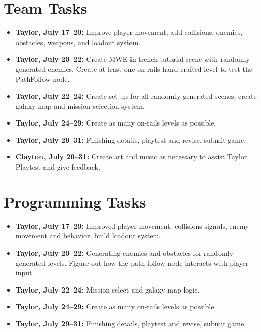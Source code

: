\documentclass[journal]{IEEEtran}
\begin{document}
\section{Team Tasks}

\begin{itemize}

    \item \textbf{Taylor, July 17--20:}
    Improve player movement, add collisions, enemies, obstacles, weapons, and loadout system.

    \item \textbf{Taylor, July 20--22:}
    Create MWE in trench tutorial scene with randomly generated enemies. Create at least one on-rails hand-crafted level to test the PathFollow node. 

    \item \textbf{Taylor, July 22--24:}
    Create set-up for all randomly generated scenes, create galaxy map and mission selection system.

    \item \textbf{Taylor, July 24--29:}
    Create as many on-rails levels as possible. 

    \item \textbf{Taylor, July 29--31:}
    Finishing details, playtest and revise, submit game.

    \item \textbf{Clayton, July 20--31:}
    Create art and music as necessary to assist Taylor. Playtest and give feedback.

\end{itemize}




\section{Programming Tasks}

\begin{itemize}

    \item \textbf{Taylor, July 17--20:}
    Improved player movement, collisions signals, enemy movement and behavior, build loadout system.

    \item \textbf{Taylor, July 20--22:}
    Generating enemies and obstacles for randomly generated levels. Figure out how the path follow node interacts with player input.  

    \item \textbf{Taylor, July 22--24:}
    Mission select and galaxy map logic.

    \item \textbf{Taylor, July 24--29:}
    Create as many on-rails levels as possible. 

    \item \textbf{Taylor, July 29--31:}
    Finishing details, playtest and revise, submit game.

\end{itemize}
\end{document}
